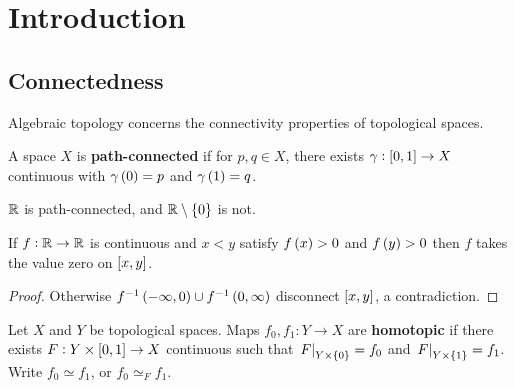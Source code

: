 \def\module{Algebraic Topology}
\def\lecturer{Prof Ivan Smith}
\def\term{Michaelmas 2020}
\def\cover{}
\def\syllabus{}
\def\thm{section}



\newcommand{\da}{\partial}
\newcommand{\pt}{\cbr{\text{point}}}





\section{Introduction}

\subsection{Connectedness}


Algebraic topology concerns the connectivity properties of topological spaces.

\begin{definition*}
A space $ X $ is \textbf{path-connected} if for $ p, q \in X $, there exists $ \gamma : \sbr{0, 1} \to X $ continuous with $ \gamma\br{0} = p $ and $ \gamma\br{1} = q $.
\end{definition*}

\begin{example*}
$ \mathbb{R} $ is path-connected, and $ \RR \setminus \cbr{0} $ is not.
\end{example*}

\begin{corollary}
If $ f : \mathbb{R} \to \mathbb{R} $ is continuous and $ x < y $ satisfy $ f\br{x} > 0 $ and $ f\br{y} > 0 $ then $ f $ takes the value zero on $ \sbr{x, y} $.
\end{corollary}

\begin{proof}
Otherwise $ f^{-1}\br{-\infty, 0} \cup f^{-1}\br{0, \infty} $ disconnect $ \sbr{x, y} $, a contradiction.
\end{proof}

\begin{definition*}
Let $ X $ and $ Y $ be topological spaces. Maps $ f_0, f_1 : Y \to X $ are \textbf{homotopic} if there exists $ F : Y \times \sbr{0, 1} \to X $ continuous such that $ \eval{F}_{Y \times \cbr{0}} = f_0 $ and $ \eval{F}_{Y \times \cbr{1}} = f_1 $. Write $ f_0 \simeq f_1 $, or $ f_0 \simeq_F f_1 $.
\end{definition*}

